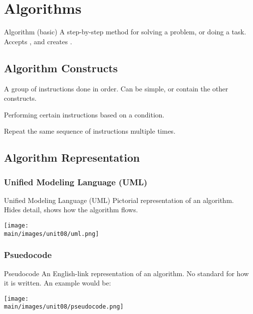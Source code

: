 \documentclass[\main/notes.tex]{subfiles}
\begin{document}
	\setcounter{chapter}{7}
	\chapter{Algorithms}
		\begin{definition}{Algorithm (basic)}
			A step-by-step method for solving a problem, or doing a task. Accepts , and creates .
		\end{definition}
		\section{Algorithm Constructs}
			\begin{description}[nosep]
				\item[Sequence] A group of instructions done in order. Can be simple, or contain the other constructs.
				\item[Decision] Performing certain instructions based on a condition.
				\item[Repetition] Repeat the same sequence of instructions multiple times.
			\end{description}
		\section{Algorithm Representation}
			\subsection{Unified Modeling Language (UML)}
				\begin{definition}{Unified Modeling Language (UML)}
					Pictorial representation of an algorithm. Hides detail, shows how the algorithm flows.
					\begin{center}
						\texttt{[image: \\main/images/unit08/uml.png]}
					\end{center}
				\end{definition}
			\subsection{Psuedocode}
				\begin{definition}{Pseudocode}
					An English-link representation of an algorithm. No standard for how it is written. An example would be:
					\begin{center}
						\texttt{[image: \\main/images/unit08/pseudocode.png]}
					\end{center}
				\end{definition}
\end{document}
